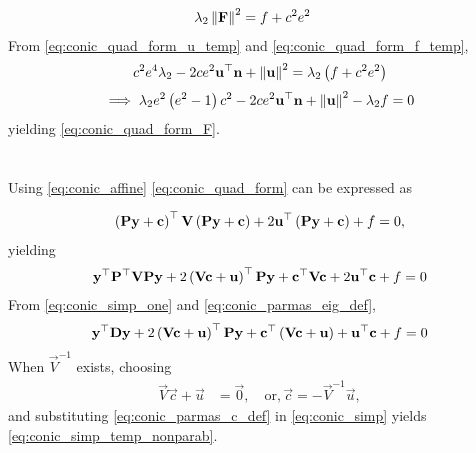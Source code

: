 \documentclass[journal,12pt,onecolumn]{IEEEtran}
\renewcommand\thesection{\arabic{section}}
\begin{document}
\begin{enumerate}[label=\thesection.\arabic*.,ref=\thesection.\theenumi]
\begin{align}
    \lambda_2\left\lVert\mathbf{F}\right\rVert^2 &= f+c^2e^2
    \label{eq:conic_quad_form_f_temp}
\end{align}
From  \eqref{eq:conic_quad_form_u_temp} and     \eqref{eq:conic_quad_form_f_temp},
\begin{align}
c^2e^4\lambda_2-2ce^2\mathbf{u}^{\top}\mathbf{n}+\left\lVert\mathbf{u}\right\rVert^2 = \lambda_2\left(f+c^2e^2\right)
\end{align}
\begin{align}
\implies \lambda_2e^2\left(e^2-1\right)c^2-2ce^2\mathbf{u}^{\top}\mathbf{n}
	+\left\lVert\mathbf{u}\right\rVert^2 - \lambda_2 f = 0
\end{align}
yielding
  \eqref{eq:conic_quad_form_F}. 

  \section{}
  \label{app:parab}
	Using 
\eqref{eq:conic_affine}
\eqref{eq:conic_quad_form} can be expressed as

\begin{align}
\left(\mathbf{P}\mathbf{y}+\mathbf{c}\right)^{\top}\mathbf{V}\left(\mathbf{P}\mathbf{y}+\mathbf{c}\right)+2\mathbf{u}^{\top}\left(\mathbf{P}\mathbf{y}+\mathbf{c}\right)+ f
	= 0, 
\end{align}
yielding 
\begin{align}
\mathbf{y}^{\top}\mathbf{P}^{\top}\mathbf{V}\mathbf{P}\mathbf{y}+2\left(\mathbf{V}\mathbf{c}+\mathbf{u}\right)^{\top}\mathbf{P}\mathbf{y}
+  \mathbf{c}^{\top}\mathbf{V}\mathbf{c} + 2\mathbf{u}^{\top}\mathbf{c} + f= 0
\label{eq:conic_simp_one}
\end{align}
%
From \eqref{eq:conic_simp_one} and \eqref{eq:conic_parmas_eig_def},
\begin{align}
\mathbf{y}^{\top}\mathbf{D}\mathbf{y}+2\left(\mathbf{V}\mathbf{c}+\mathbf{u}\right)^{\top}\mathbf{P}\mathbf{y}
+  \mathbf{c}^{\top}\left(\mathbf{V}\mathbf{c} + \mathbf{u}\right)+ \mathbf{u}^{\top}\mathbf{c} + f= 0
\label{eq:conic_simp}
\end{align}
When $\vec{V}^{-1}$ exists, choosing
\begin{align}
\vec{V}\vec{c}+\vec{u} &= \vec{0}, \quad \text{or}, \vec{c} = -\vec{V}^{-1}\vec{u},
\label{eq:conic_parmas_c_def}
\end{align}
%
and substituting \eqref{eq:conic_parmas_c_def}
in \eqref{eq:conic_simp}
yields \eqref{eq:conic_simp_temp_nonparab}. 

\end{enumerate}
\end{document}
